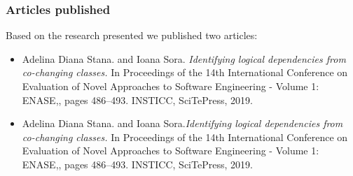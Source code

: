\documentclass{beamer}
\begin{document}
 \begin{frame}
\frametitle{Articles published}
Based on the research presented we published two articles:
\begin{itemize}
\item Adelina Diana Stana. and Ioana Sora.  \textit{Identifying logical dependencies from
co-changing classes.} In Proceedings of the 14th International Conference on
Evaluation of Novel Approaches to Software Engineering - Volume 1: ENASE,,
pages 486–493. INSTICC, SciTePress, 2019.


\item Adelina Diana Stana. and Ioana Sora.\textit{Identifying logical dependencies from
co-changing classes.} In Proceedings of the 14th International Conference on
Evaluation of Novel Approaches to Software Engineering - Volume 1: ENASE,,
pages 486–493. INSTICC, SciTePress, 2019.
\end{itemize}
\end{frame}

\end{document}
